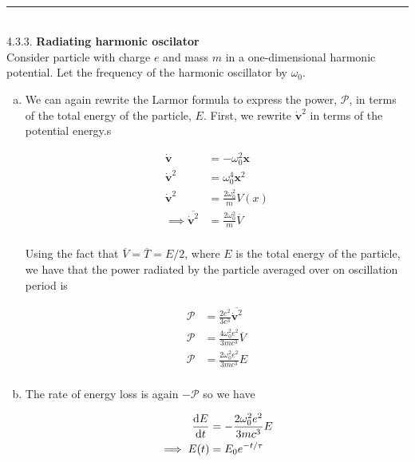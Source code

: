\documentclass[]{article}
\begin{document}
\hfill \\ 
\noindent\rule{15cm}{0.4pt} \\

4.3.3. {\bf Radiating harmonic oscilator } \\

Consider particle with charge $e$ and mass $m$ in a one-dimensional harmonic potential. Let the frequency of the harmonic oscillator by $\omega_0$.

\begin{enumerate}[a)]

\item We can again rewrite the Larmor formula to express the power, $\mathscr{P}$, in terms of the total energy of the particle, $E$. First, we rewrite $ \dot{\bm{v}}^2$ in terms of the potential energy.s


\begin{equation}
\begin{split}
\dot{\bm{v}} & = - \omega_0^2 \bm{x} \\
\dot{\bm{v}}^2 & = \omega_0^4\bm{x}^2 \\
\dot{\bm{v}}^2 & =  \frac{2  \omega_0^2 }{m} V(x) \\
\implies \overline{\dot{\bm{v}}^2} & =  \frac{2  \omega_0^2 }{m} \overline{V} \\
\end{split}
\end{equation}

Using the fact that $\overline{V} = \overline{T} = E/2$, where $E$ is the total energy of the particle, we have that the power radiated by the particle averaged over on oscillation period is


\begin{equation}
\begin{split}
\mathscr{P} & = \frac{2e^2}{3c^3} \overline{\dot{\bm{v}}^2} \\
\mathscr{P} & = \frac{4\omega_0^2e^2}{3mc^3} \overline{V}\\ 
\mathscr{P} & = \frac{2\omega_0^2e^2}{3mc^3} E \\ 
\end{split}
\end{equation}

\item The rate of energy loss is again $-\mathscr{P}$ so we have


\begin{equation}
\begin{split}
\dv{E}{t} & = - \frac{2\omega_0^2e^2}{3mc^3} E \\ 
\implies E(t) & = E_0 e^{-t/\tau} \\
\end{split}
\end{equation}


\end{enumerate}
\end{document}
